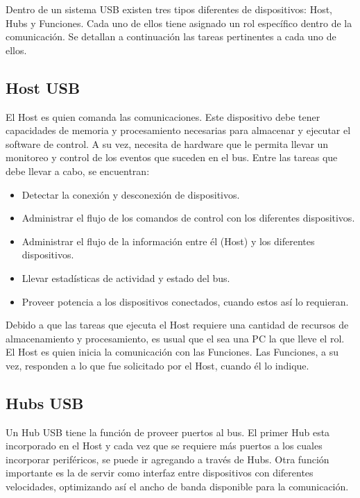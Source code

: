 Dentro de un sistema USB existen tres tipos diferentes de dispositivos: Host, Hubs y Funciones. Cada uno de ellos tiene asignado un rol específico dentro de la comunicación. Se detallan a continuación las tareas pertinentes a cada uno de ellos.\\

\subsection{Host USB}
	El Host es quien comanda las comunicaciones. Este dispositivo debe tener capacidades de memoria y procesamiento necesarias para almacenar y ejecutar el software de control. A su vez, necesita de hardware que le permita llevar un monitoreo y control de los eventos que suceden en el bus. Entre las tareas que debe llevar a cabo, se encuentran:
	
	\begin{itemize}
		\item Detectar la conexión y desconexión de dispositivos.
		\item Administrar el flujo de los comandos de control con los diferentes dispositivos.
		\item Administrar el flujo de la información entre él (Host) y los diferentes dispositivos.
		\item Llevar estadísticas de actividad y estado del bus.
		\item Proveer potencia a los dispositivos conectados, cuando estos así lo requieran.
	\end{itemize}
	
	Debido a que las tareas que ejecuta el Host requiere una cantidad de recursos de almacenamiento y procesamiento, es usual que el sea una PC la que lleve el rol. El Host es quien inicia la comunicación con las Funciones. Las Funciones, a su vez, responden a lo que fue solicitado por el Host, cuando él lo indique.\\
	
\subsection{Hubs USB}
	Un Hub USB tiene la función de proveer puertos al bus. El primer Hub esta incorporado en el Host y cada vez que se requiere más puertos a los cuales incorporar periféricos, se puede ir agregando a través de Hubs. Otra función importante es la de servir como interfaz entre dispositivos con diferentes velocidades, optimizando así el ancho de banda disponible para la comunicación.\\
	
